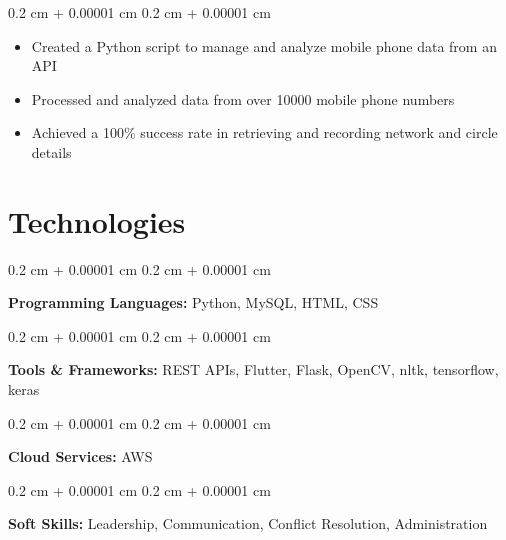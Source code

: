 \documentclass[12pt, letterpaper]{article}
\newenvironment{highlights}{
    \begin{itemize}[
        topsep=0.10 cm,
        parsep=0.10 cm,
        partopsep=0pt,
        itemsep=0pt,
        leftmargin=0.4 cm + 10pt
    ]
}{
    \end{itemize}
} %
\newenvironment{onecolentry}{
    \begin{adjustwidth}{
        0.2 cm + 0.00001 cm
    }{
        0.2 cm + 0.00001 cm
    }
}{
    \end{adjustwidth}
} %
\begin{document}
        \vspace{0.10 cm}
        \begin{onecolentry}
            \begin{highlights}
                \item Created a Python script to manage and analyze mobile phone data from an API
                \item Processed and analyzed data from over 10000 mobile phone numbers
                \item Achieved a 100\% success rate in retrieving and recording network and circle details
            \end{highlights}
        \end{onecolentry}



    
    \section{Technologies}



        
        \begin{onecolentry}
            \textbf{Programming Languages:} Python, MySQL, HTML, CSS
        \end{onecolentry}

        \vspace{0.2 cm}

        \begin{onecolentry}
            \textbf{Tools \& Frameworks:} REST APIs, Flutter, Flask, OpenCV, nltk, tensorflow, keras
        \end{onecolentry}

        \vspace{0.2 cm}

        \begin{onecolentry}
            \textbf{Cloud Services:} AWS
        \end{onecolentry}

        \vspace{0.2 cm}

        \begin{onecolentry}
            \textbf{Soft Skills:} Leadership, Communication, Conflict Resolution, Administration
        \end{onecolentry}


    
\end{document}
